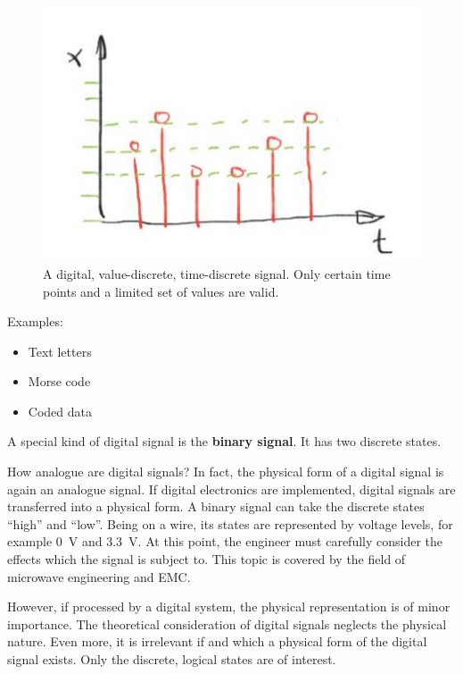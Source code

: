 \begin{refsection}
\begin{figure}[H]
	\centering
	\includegraphics{../chapter01/Signal_Digital.jpg}
	\caption[A digital, value-discrete, time-discrete signal]{A digital, value-discrete, time-discrete signal. Only certain time points and a limited set of values are valid.}
	\label{fig:ch01:Signal_Digital}
\end{figure}

Examples:
\begin{itemize}
	\item Text letters
	\item Morse code
	\item Coded data
\end{itemize}

A special kind of digital signal is the \textbf{binary signal}. It has two discrete states.

\begin{excursus}{How analogue are digital signals?}
	In fact, the physical form of a digital signal is again an analogue signal. If digital electronics are implemented, digital signals are transferred into a physical form. A binary signal can take the discrete states ``high'' and ``low''. Being on a wire, its states are represented by voltage levels, for example \SI{0}{V} and \SI{3.3}{V}. At this point, the engineer must carefully consider the effects which the signal is subject to. This topic is covered by the field of microwave engineering and \ac{EMC}.
	
	However, if processed by a digital system, the physical representation is of minor importance. The theoretical consideration of digital signals neglects the physical nature. Even more, it is irrelevant if and which a physical form of the digital signal exists. Only the discrete, logical states are of interest.
\end{excursus}



\end{refsection}
